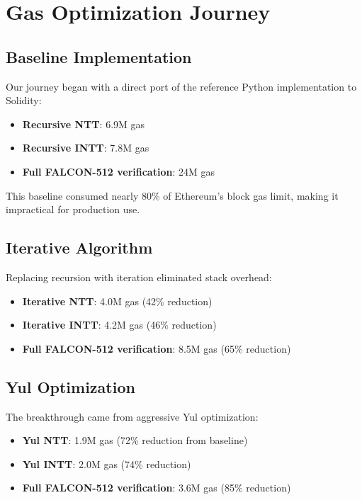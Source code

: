 \section{Gas Optimization Journey}


\subsection{Baseline Implementation}

Our journey began with a direct port of the reference Python implementation to Solidity:

\begin{itemize}
\item \textbf{Recursive NTT}: 6.9M gas
\item \textbf{Recursive INTT}: 7.8M gas
\item \textbf{Full FALCON-512 verification}: 24M gas
\end{itemize}

This baseline consumed nearly 80\% of Ethereum's block gas limit, making it impractical for production use.

\subsection{Iterative Algorithm}

Replacing recursion with iteration eliminated stack overhead:

\begin{itemize}
\item \textbf{Iterative NTT}: 4.0M gas (42\% reduction)
\item \textbf{Iterative INTT}: 4.2M gas (46\% reduction)
\item \textbf{Full FALCON-512 verification}: 8.5M gas (65\% reduction)
\end{itemize}

\subsection{Yul Optimization}

The breakthrough came from aggressive Yul optimization:

\begin{itemize}
\item \textbf{Yul NTT}: 1.9M gas (72\% reduction from baseline)
\item \textbf{Yul INTT}: 2.0M gas (74\% reduction)
\item \textbf{Full FALCON-512 verification}: 3.6M gas (85\% reduction)
\end{itemize}

